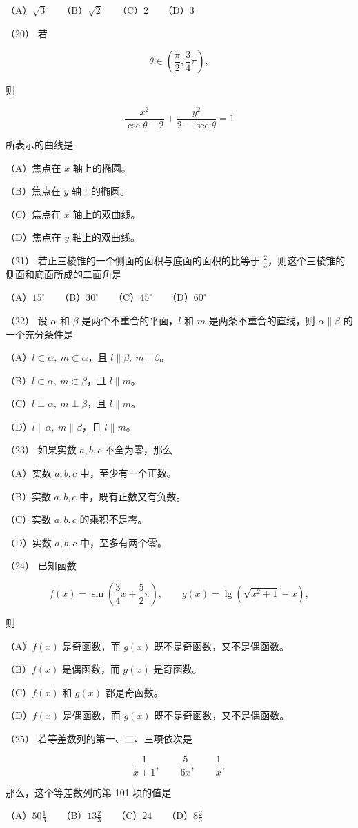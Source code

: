 \begin{question}
（A）$\sqrt3$　　（B）$\sqrt2$　　（C）$2$　　（D）$3$

（20） 若

\nopagebreak[4]
\[
\theta\in\left(\frac\pi2,\frac34\pi\right),
\]

则

\nopagebreak[4]
\[
\frac{x^2}{\csc\theta-2}+\frac{y^2}{2-\sec\theta}=1
\]

所表示的曲线是

（A）焦点在 $x$ 轴上的椭圆。

（B）焦点在 $y$ 轴上的椭圆。

（C）焦点在 $x$ 轴上的双曲线。

（D）焦点在 $y$ 轴上的双曲线。

（21） 若正三棱锥的一个侧面的面积与底面的面积的比等于 $\frac23$，则这个三棱锥的侧面和底面所成的二面角是

（A）$15^\circ$　　（B）$30^\circ$　　（C）$45^\circ$　　（D）$60^\circ$

（22） 设 $\alpha$ 和 $\beta$ 是两个不重合的平面，$l$ 和 $m$ 是两条不重合的直线，则 $\alpha\parallel\beta$ 的一个充分条件是

（A）$l\subset\alpha,\ m\subset\alpha$，且 $l\parallel\beta,\ m\parallel\beta$。

（B）$l\subset\alpha,\ m\subset\beta$，且 $l\parallel m$。

（C）$l\perp\alpha,\ m\perp\beta$，且 $l\parallel m$。

（D）$l\parallel\alpha,\ m\parallel\beta$，且 $l\parallel m$。

（23） 如果实数 $a,b,c$ 不全为零，那么

（A）实数 $a,b,c$ 中，至少有一个正数。

（B）实数 $a,b,c$ 中，既有正数又有负数。

（C）实数 $a,b,c$ 的乘积不是零。

（D）实数 $a,b,c$ 中，至多有两个零。

（24） 已知函数

\nopagebreak[4]
\[
f(x)=\sin\left(\frac34x+\frac52\pi\right),
\qquad
g(x)=\lg\left(\sqrt{x^2+1}-x\right),
\]

则

（A）$f(x)$ 是奇函数，而 $g(x)$ 既不是奇函数，又不是偶函数。

（B）$f(x)$ 是偶函数，而 $g(x)$ 是奇函数。

（C）$f(x)$ 和 $g(x)$ 都是奇函数。

（D）$f(x)$ 是偶函数，而 $g(x)$ 既不是奇函数，又不是偶函数。

（25） 若等差数列的第一、二、三项依次是

\nopagebreak[4]
\[
\frac1{x+1},\qquad \frac5{6x},\qquad \frac1x,
\]

那么，这个等差数列的第 101 项的值是

（A）$50\frac13$　　（B）$13\frac23$　　（C）$24$　　（D）$8\frac23$

\end{question}

